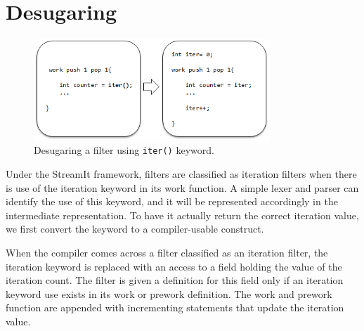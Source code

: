 \section{Desugaring}

%
%
%
%
%
%
%
%
%
%


\begin{figure}[t!]
\centering
\includegraphics[width=3.5in]{figures/desugaring.png}
\caption{Desugaring a filter using \texttt{iter()} keyword.\protect\label{fig:desugar}}
\end{figure}


Under the StreamIt framework, filters are classified as iteration filters when there is use of the iteration keyword in its work function.  A simple lexer and parser can identify the use of this keyword, and it will be represented accordingly in the intermediate representation.  To have it actually return the correct iteration value, we first convert the keyword to a compiler-usable construct.

When the compiler comes across a filter classified as an iteration filter, the iteration keyword is replaced with an access to a field holding the value of the iteration count.  The filter is given a definition for this field only if an iteration keyword use exists in its work or prework definition.  The work and prework function are appended with incrementing statements that update the iteration value.

